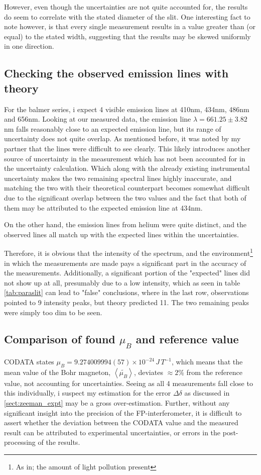 \documentclass[11pt,a4paper]{article}
\begin{document}
    However, even though the uncertainties are not quite accounted for, the results do seem to correlate with the stated diameter of the slit. One interesting fact to note however, is that every single measurement results in a value greater than (or equal) to the stated width, suggesting that the results may be skewed uniformly in one direction.

  \subsection{Checking the observed emission lines with theory}
    For the balmer series, i expect 4 visible emission lines at 410nm, 434nm, 486nm and 656nm. Looking at our measured data, the emission line $\lambda = 661.25\pm 3.82\,$nm falls reasonably close to an expected emission line, but its range of uncertainty does not quite overlap. As mentioned before, it was noted by my partner that the lines were difficult to see clearly. This likely introduces another source of uncertainty in the measurement which has not been accounted for in the uncertainty calculation. Which along with the already existing instrumental uncertainty makes the two remaining spectral lines highly inaccurate, and matching the two with their theoretical counterpart becomes somewhat difficult due to the significant overlap between the two values and the fact that both of them may be attributed to the expected emission line at 434nm.

    On the other hand, the emission lines from helium were quite distinct, and the observed lines all match up with the expected lines within the uncertainties.

    Therefore, it is obvious that the intensity of the spectrum, and the environment\footnote{As in; the amount of light pollution present} in which the measurements are made pays a significant part in the accuracy of the measurements. Additionally, a significant portion of the "expected" lines did not show up at all, presumably due to a low intensity, which as seen in table \ref{tab:paraslit} can lead to "false" conclusions, where in the last row, observations pointed to 9 intensity peaks, but theory predicted 11. The two remaining peaks were simply too dim to be seen.

  \subsection{Comparison of found $\mu_B$ and reference value}
    CODATA states $\mu_B = 9.274 009 994(57)\times10^{-24}\,J\,T^{-1}$, which means that the mean value of the Bohr magneton, $\left< \tilde{\mu_B}\right>$, deviates $\approx 2\%$ from the reference value, not accounting for uncertainties. Seeing as all 4 measurements fall close to this individually, i suspect my estimation for the error $\Delta \delta$ as discussed in \ref{sect:zeeman_expt} may be a gross over-estimation. Further, without any significant insight into the precision of the FP-interferometer, it is difficult to assert whether the deviation between the CODATA value and the measured result can be attributed to experimental uncertainties, or errors in the post-processing of the results.
\end{document}
